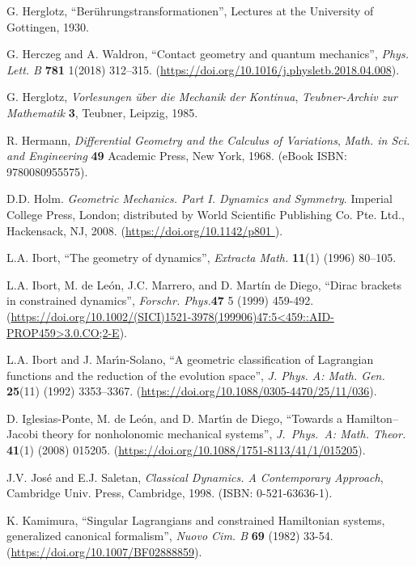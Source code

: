 \documentclass[12pt]{report}
\begin{document}
\begin{thebibliography}{999}
G. Herglotz, 
``Ber\"uhrungstransformationen'', 
Lectures at the University of Gottingen, 1930.

G. Herczeg and A. Waldron,
``Contact geometry and quantum mechanics'',
{\sl Phys. Lett. B} {\bf 781} 1(2018) 312--315.
(\url{https://doi.org/10.1016/j.physletb.2018.04.008}).

G. Herglotz, 
{\it Vorlesungen \"uber die Mechanik der Kontinua}, 
{\sl Teubner-Archiv zur Mathematik} {\bf 3},
Teubner, Leipzig, 1985.

R. Hermann,
{\it Differential Geometry and the Calculus of Variations},
{\sl Math. in Sci. and Engineering} {\bf 49}
Academic Press, New York, 1968.
(eBook ISBN: 9780080955575).

D.D. Holm.
\textit{Geometric Mechanics. Part I. Dynamics and Symmetry}. 
Imperial College Press, London; distributed by World Scientific Publishing Co. Pte. Ltd., Hackensack, NJ, 2008.
(\url{https://doi.org/10.1142/p801 }).

L.A. Ibort,
``The geometry of dynamics'',
{\sl Extracta Math.} {\bf 11}(1) (1996) 80--105.

L.A. Ibort, M. de Le\'on, J.C. Marrero, and D. Mart\'in de Diego,
``Dirac brackets in constrained dynamics'',
{\sl Forschr. Phys.}{\bf 47} 5 (1999) 459-492.
(\url{https://doi.org/10.1002/(SICI)1521-3978(199906)47:5<459::AID-PROP459>3.0.CO;2-E}).

L.A. Ibort and J. Mar\'\i n-Solano,
``A geometric classification of Lagrangian functions and the reduction of the evolution space'',
{\sl J. Phys. A: Math. Gen.} {\bf 25}(11) (1992) 3353--3367.
(\url{https://doi.org/10.1088/0305-4470/25/11/036}).

{\rm D. Iglesias-Ponte, M. de Le\'on, and D. Mart\'\i n de Diego},
``Towards a Hamilton--Jacobi theory for nonholonomic mechanical systems'',
{\sl J.~Phys.~A: Math. Theor.} {\bf 41}(1) (2008) 015205. %
(\url{https://doi.org/10.1088/1751-8113/41/1/015205}).

J.V. Jos\'e and E.J. Saletan,
{\it Classical Dynamics. A Contemporary Approach},
Cambridge Univ. Press, Cambridge, 1998.
(ISBN: 0-521-63636-1).

K. Kamimura,
``Singular Lagrangians and constrained Hamiltonian systems,
generalized canonical formalism'',
{\sl Nuovo Cim. B} {\bf 69} (1982) 33-54.
(\url{https://doi.org/10.1007/BF02888859}).


\end{thebibliography}
\end{document}

